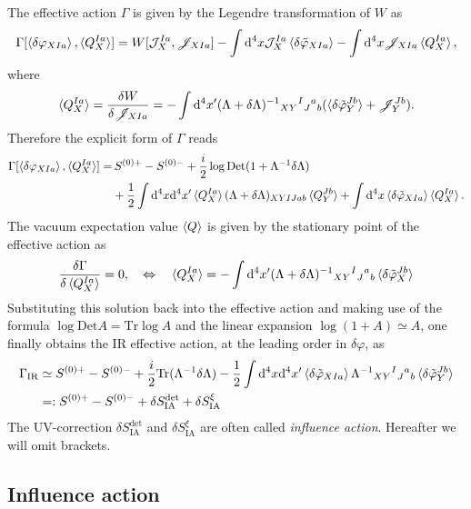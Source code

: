 \documentclass[aps, prd
, preprint
, nofootinbib 
, notitlepage
, longbibliography
]{revtex4-1}
\newcommand{\dd}{\mathrm{d}}
\newcommand{\IR}{\text{IR}}
\newcommand{\Det}{\mathrm{Det}}
\newcommand{\Tr}{\mathrm{Tr}}
\newcommand{\IA}{\mathrm{IA}}
\newcommand{\calJ}{\mathcal{J}}
\newcommand{\scrJ}{\mathscr{J}}
\newcommand{\bae}[1]{\begin{align} #1 \end{align}}
\begin{document}
The effective action $\Gamma$ is given by the Legendre transformation of $W$ as
\bae{
    \Gamma[\braket{\delta\varphi_{XIa}},\braket{Q_X^{Ia}}]=W[\calJ_X^{Ia},\scrJ_{XIa}]-\int\dd^4x\calJ_X^{Ia}\braket{\delta\tilde{\varphi}_{XIa}}-\int\dd^4x\scrJ_{XIa}\braket{Q_X^{Ia}},
}
where
\bae{
    \braket{Q_X^{Ia}}=\frac{\delta W}{\delta\scrJ_{XIa}}=-\int\dd^4x^\prime(\Lambda+\delta\Lambda)^{-1}{}_{XY}{}^I{}_J{}^a{}_b(\braket{\delta\tilde{\varphi}_Y^{Jb}}+\scrJ_Y^{Jb}).
}
Therefore the explicit form of $\Gamma$ reads
\bae{
    \Gamma[\braket{\delta\varphi_{XIa}},\braket{Q_X^{Ia}}]=&\,S^{(0)+}-S^{(0)-}+\frac{i}{2}\log\Det(1+\Lambda^{-1}\delta\Lambda) \nonumber \\
    &+\frac{1}{2}\int\dd^4x\dd^4x^\prime\braket{Q_X^{Ia}}(\Lambda+\delta\Lambda)_{XYIJab}\braket{Q_Y^{Jb}}+\int\dd^4x\braket{\delta\tilde{\varphi}_{XIa}}\braket{Q_X^{Ia}}.
}
The vacuum expectation value $\braket{Q}$ is given by the stationary point of the effective action as
\bae{
    \frac{\delta\Gamma}{\delta\braket{Q_X^{Ia}}}=0, \quad \Leftrightarrow \quad \braket{Q_X^{Ia}}=-\int\dd^4x^\prime(\Lambda+\delta\Lambda)^{-1}{}_{XY}{}^I{}_J{}^a{}_b\braket{\delta\tilde{\varphi}_X^{Jb}}
}
Substituting this solution back into the effective action and making use of the formula $\log\Det A=\Tr\log A$ and the linear expansion $\log(1+A)\simeq A$, one finally obtains the IR effective action, at the leading order in $\delta\varphi$, as
\bae{\label{eq: GammaIR}
    \Gamma_\IR&\simeq S^{(0)+}-S^{(0)-}+\frac{i}{2}\Tr(\Lambda^{-1}\delta\Lambda)-\frac{1}{2}\int\dd^4x\dd^4x^\prime\braket{\delta\tilde{\varphi}_{XIa}}\Lambda^{-1}{}_{XY}{}^I{}_J{}^a{}_b\braket{\delta\tilde{\varphi}_Y^{Jb}} \nonumber \\
    &=:S^{(0)+}-S^{(0)-}+\delta S_\IA^\mathrm{det}+\delta S_\IA^\xi
}
The UV-correction $\delta S_\IA^\mathrm{det}$ and $\delta S_\IA^\xi$ are often called \emph{influence action}.
Hereafter we will omit brackets.




\subsection{Influence action}
\end{document}
